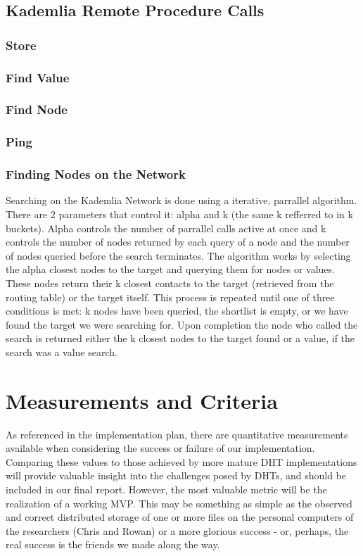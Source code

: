 \documentclass[12pt]{report}
\begin{document}
        \subsection{Kademlia Remote Procedure Calls}
            \subsubsection{Store}
            \subsubsection{Find Value}
            \subsubsection{Find Node}
            \subsubsection{Ping}
            \subsubsection{Finding Nodes on the Network}
	    	Searching on the Kademlia Network is done using a iterative, parrallel
		algorithm. There are 2 parameters that control it: alpha and k (the same k refferred to in k 
		buckets). Alpha controls the number of parrallel calls active at once and k controls
		the number of nodes returned by each query of a node and the number of 
		nodes queried before the search terminates. The algorithm works by selecting 
		the alpha closest nodes to the target and querying them for nodes or values.
		These nodes return their k closest contacts to the target (retrieved from the routing table)  or the target 
		itself. This process is repeated until one of three conditions is met: k nodes
		have been queried, the shortlist is empty, or we have found the target we were
		searching for. Upon completion the node who called the search is returned either the k closest
		nodes to the target found or a value, if the search was a value search.

    \section{Measurements and Criteria}
    As referenced in the implementation plan, there are quantitative
    measurements available when considering the success or failure of our
    implementation.  Comparing these values to those achieved by more mature
    DHT implementations will provide valuable insight into the challenges posed
    by DHTs, and should be included in our final report.  However, the most
    valuable metric will be the realization of a working MVP.  This may be
    something as simple as the observed and correct distributed storage of one
    or more files on the personal computers of the researchers (Chris and
    Rowan) or a more glorious success - or, perhaps, the real success is the
    friends we made along the way.
\end{document}
